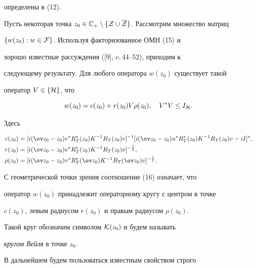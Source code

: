 определены в (12).








Пусть некоторая точка $z_0 \in {\Bbb C}_{+} \setminus \{ {\cal Z}


\cup \overline {\cal Z} \} $. Рассмотрим множество матриц


$\{w(z_0):w\in {\cal F} \}$. Используя факторизованное ОМН (15) и


хорошо известные рассуждения ([9], c.\,44--52), приходим к


следующему результату. Для любого оператора $ w(z_0)$ существует такой


оператор $ V\in \{\cal H \}$, что


\begin{equation}


w(z_0)=c(z_0)+r (z_0) V\rho (z_0),\quad V^* V\leq I_{\cal H}.


\end{equation}


Здесь


\begin{align}


c(z_0)&=[ i(\ov z_0-z_0) v^*R_T^*(z_0)K^{-1}R_T(z_0)v ] ^{-1}


[ i(\ov z_0-z_0)u^*R_T^*(z_0)K^{-1}R_T(z_0)v-iI ] ^*, \notag\\


r (z_0)&=[ i(\ov z_0-z_0)


v^*R_T^*(z_0)K^{-1}R_T(z_0)v ] ^{-\frac{1}{2}}, \\


\rho (z_0)&=[ i(\ov z_0-z_0)


v^*R_T^*(\ov z_0)K^{-1}R_T(\ov z_0)v ] ^{-\frac{1}{2}}.\notag


\end{align}


С геометрической точки зрения соотношение (16) означает, что


оператор $w(z_0)$ принадлежит операторному кругу с центром в точке


$c(z_0)$, левым радиусом $r(z_0)$ и правым радиусом $\rho (z_0)$.


Такой круг обозначим символом ${\cal K}(z_0)$ и будем называть


{\it кругом Вейля} в точке $z_0$.





В дальнейшем будем пользоваться известным свойством строго


